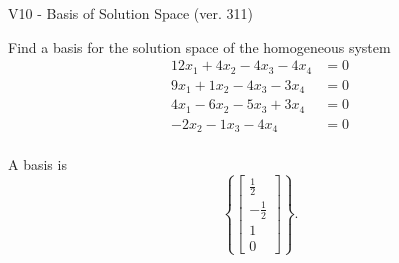 \begin{exercise}
  \begin{exerciseTitle}V10 - Basis of Solution Space (ver. 311)\end{exerciseTitle}
  \begin{exerciseStatement}
    Find a basis for the solution space of the homogeneous system 
\begin{align*}
 12 x_ 1 + 4 x_ 2 -4 x_ 3 -4 x_ 4 &= 0  \\ 
  9 x_ 1 + 1 x_ 2 -4 x_ 3 -3 x_ 4 &= 0  \\ 
  4 x_ 1 -6 x_ 2 -5 x_ 3 + 3 x_ 4 &= 0  \\ 
  -2 x_ 2 -1 x_ 3 -4 x_ 4 &= 0  \\ 
 \end{align*}


 
  \end{exerciseStatement}

  \begin{exerciseAnswer}
   A basis is   
\[\left\{\left[\begin{array}{c}
\frac{1}{2} \\
-\frac{1}{2} \\
1 \\
0
\end{array}\right]\right\}.\]

  


  \end{exerciseAnswer}
\end{exercise}
